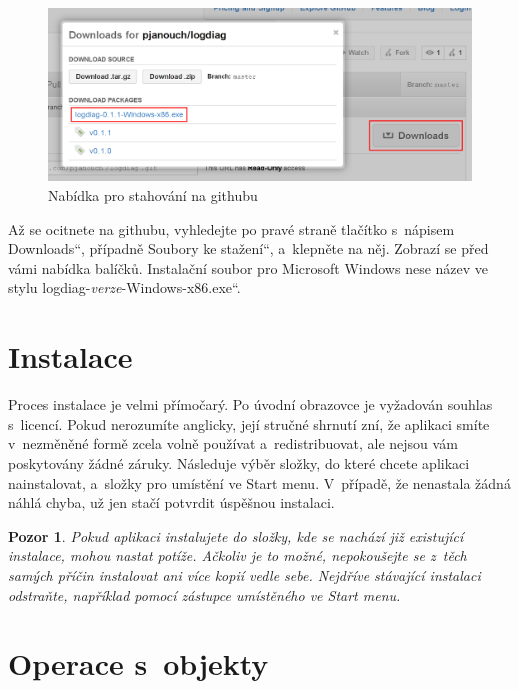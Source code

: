 \documentclass[12pt,oneside,a4paper,titlepage,final]{article}
\theoremstyle{note}
\newtheorem*{warning}{Pozor}
\renewcommand*{\uv}[1]{\quotedblbase #1\textquotedblleft}
\begin{document}
\begin{figure}[ht]
	\centering
	\includegraphics[width=\textwidth,keepaspectratio]{github}
	\caption{Nabídka pro stahování na githubu}
	\label{github-download}
\end{figure}

Až se ocitnete na githubu, vyhledejte po pravé straně tlačítko s~nápisem \uv{Downloads}, případně \uv{Soubory ke stažení}, a~klepněte na něj. Zobrazí se před vámi nabídka balíčků. Instalační soubor pro Microsoft Windows nese název ve stylu \uv{logdiag-\emph{verze}-Windows-x86.exe}.

\section{Instalace}
Proces instalace je velmi přímočarý. Po úvodní obrazovce je vyžadován souhlas s~licencí. Pokud nerozumíte anglicky, její stručné shrnutí zní, že aplikaci smíte v~nezměněné formě zcela volně používat a~redistribuovat, ale nejsou vám poskytovány žádné záruky. Následuje výběr složky, do které chcete aplikaci nainstalovat, a~složky pro umístění ve Start menu. V~případě, že nenastala žádná náhlá chyba, už jen stačí potvrdit úspěšnou instalaci.

\begin{warning}
	Pokud aplikaci instalujete do složky, kde se nachází již existující instalace, mohou nastat potíže. Ačkoliv je to možné, nepokoušejte se z~těch samých příčin instalovat ani více kopií vedle sebe. Nejdříve stávající instalaci odstraňte, například pomocí zástupce umístěného ve Start menu.
\end{warning}

\section{Operace s~objekty}

%
\end{document}
